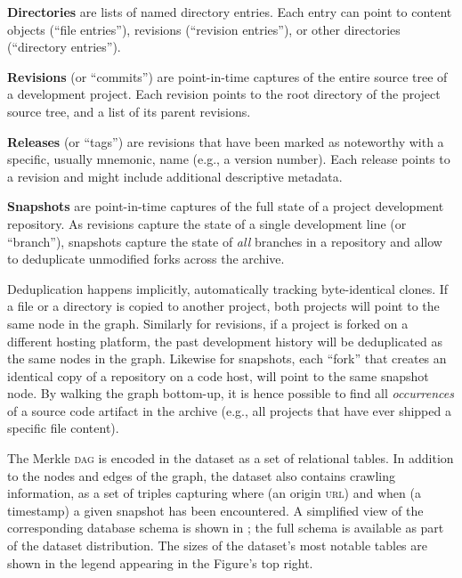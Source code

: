 \textbf{Directories} are lists of named directory entries.
Each entry can
point to content objects (``file entries''), revisions (``revision entries''),
or other directories (``directory entries'').

\textbf{Revisions} (or ``commits'') are point-in-time captures of the entire
source tree of a development project. Each revision points to the root
directory of the project source tree, and a list of its parent revisions.

\textbf{Releases} (or ``tags'') are revisions that have been marked as noteworthy
with a specific, usually mnemonic, name (e.g., a version number). Each release
points to a revision and might include additional descriptive metadata.

\textbf{Snapshots} are point-in-time captures of the full state of a project
development repository. As revisions capture the state of a single development
line (or ``branch''), snapshots capture the state of \emph{all} branches in a
repository and allow to deduplicate unmodified forks across the archive.


Deduplication happens implicitly, automatically tracking byte-identical clones.
If a file or a directory is copied to another project, both projects will point
to the same node in the graph. Similarly for revisions, if a project is forked
on a different hosting platform, the past development history will be
deduplicated as the same nodes in the graph.  Likewise for snapshots, each
``fork'' that creates an identical copy of a repository on a code host, will
point to the same snapshot node.  By walking the graph bottom-up, it is hence
possible to find all \emph{occurrences} of a source code artifact in the
archive (e.g., all projects that have ever shipped a specific file content).

The Merkle \textsc{dag} is encoded in the dataset as a set of relational tables. In
addition to the nodes and edges of the graph, the dataset also contains
crawling information, as a set of triples capturing where (an origin \textsc{url}) and
when (a timestamp) a given snapshot has been encountered. A simplified view of
the corresponding database schema is shown in ; the full schema
is available as part of the dataset distribution.
The sizes of the dataset's most notable tables are shown in the legend
appearing in the Figure's top right.

